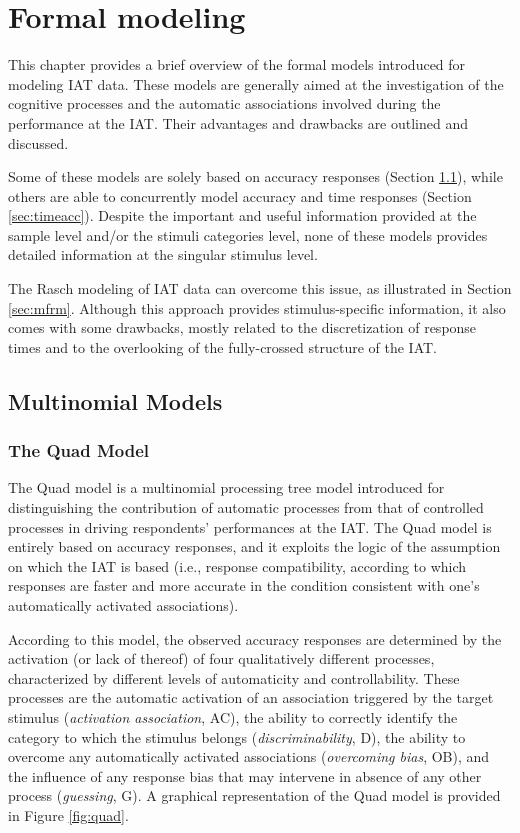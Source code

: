 \documentclass[12pt]{book}
\begin{document}
\chapter{Formal modeling}\label{chap:formalModel}

This chapter provides a brief overview of the formal models introduced for modeling IAT data. 
These models are generally aimed at the investigation of the cognitive processes and the automatic associations involved during the performance at the IAT. Their advantages and drawbacks are outlined and discussed.

Some of these models  are solely based on accuracy responses (Section \ref{sec:multimodel}), while others are able to concurrently model accuracy and time responses (Section \ref{sec:timeacc}).
Despite the important and useful information provided at the sample level and/or the stimuli categories level, none of these models provides detailed information at the singular stimulus level.

The Rasch modeling of IAT data can overcome this issue, as illustrated in Section \ref{sec:mfrm}. Although this approach provides stimulus-specific information, it also comes with some drawbacks, mostly related to the discretization of response times and to the overlooking of the fully-crossed structure of the IAT.


\section{Multinomial Models}\label{sec:multimodel}
\subsection{The Quad Model}\label{sub:quad}
The Quad model \cite{Conrey2005} is a multinomial processing tree model introduced for distinguishing the contribution of automatic processes from that of controlled processes in driving respondents' performances at the IAT. 
The Quad model is entirely based on accuracy responses, and it exploits the logic of the assumption on which the IAT is based (i.e., response compatibility, according to which responses are faster and more accurate in the condition consistent with one's automatically activated associations). 

According to this model, the observed accuracy responses are determined by the activation (or lack of thereof) of four qualitatively different processes, characterized by different levels of automaticity and controllability.
These processes are the automatic activation of an association triggered by the target stimulus (\emph{activation association}, AC), the ability to correctly identify the category to which the stimulus belongs (\emph{discriminability}, D), the ability to overcome any automatically activated associations (\emph{overcoming bias}, OB), and the influence of any response bias that may intervene in absence of any other process (\emph{guessing}, G). A graphical representation of the Quad model is provided in Figure \ref{fig:quad}.
\end{document}
